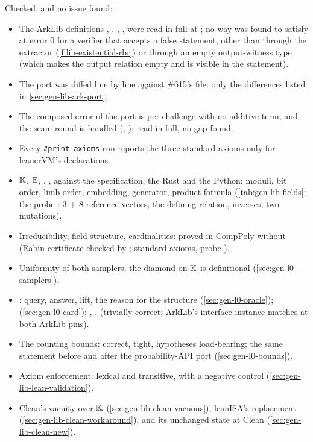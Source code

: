 Checked, and no issue found:
\begin{itemize}
\item The ArkLib definitions , ,
  , ,  were read in full at
  ; no way was found to satisfy  at error
  $0$ for a verifier that accepts a false statement, other than through the extractor
  (\cref{f:lib-existential-rbr}) or through an empty output-witness type (which makes the output
  relation empty and is visible in the statement).
\item The port  was diffed line by line against \#615's file: only the
  differences listed in \cref{sec:gen-lib-ark-port}.
\item The composed error of the port is per challenge with no additive term, and the seam round is
  handled (, ); read in full, no gap found.
\item Every \texttt{\#print axioms} run reports the three standard axioms only for leanerVM's
  declarations.
\item $\mathbb{K}$, $\mathbb{E}$, , ,  against the specification, the Rust and the Python:
  moduli, bit order, limb order, embedding, generator, product formula (\cref{tab:gen-lib-fields};
  the probe : 3 + 8 reference vectors, the defining relation, inverses, two
  mutations).
\item Irreducibility, field structure, cardinalities: proved in CompPoly without
   (Rabin certificate checked by ; standard axioms, probe
  ).
\item Uniformity of both samplers; the diamond on $\mathbb{K}$ is definitional (\cref{sec:gen-l0-samplers}).
\item {}: query, answer, lift, the reason for the structure
  (\cref{sec:gen-l0-oracle});  (\cref{sec:gen-l0-card}); ,
  ,  (trivially correct; ArkLib's  interface instance
  matches  at both ArkLib pins).
\item The counting bounds: correct, tight, hypotheses load-bearing; the same statement before and
  after the probability-API port (\cref{sec:gen-l0-bounds}).
\item Axiom enforcement: lexical and transitive, with a negative control
  (\cref{sec:gen-lib-lean-validation}).
\item Clean's vacuity over $\mathbb{K}$ (\cref{sec:gen-lib-clean-vacuous}), leanISA's replacement
  (\cref{sec:gen-lib-clean-workaround}), and its unchanged state at Clean 
  (\cref{sec:gen-lib-clean-new}).
\end{itemize}

\par\endgroup